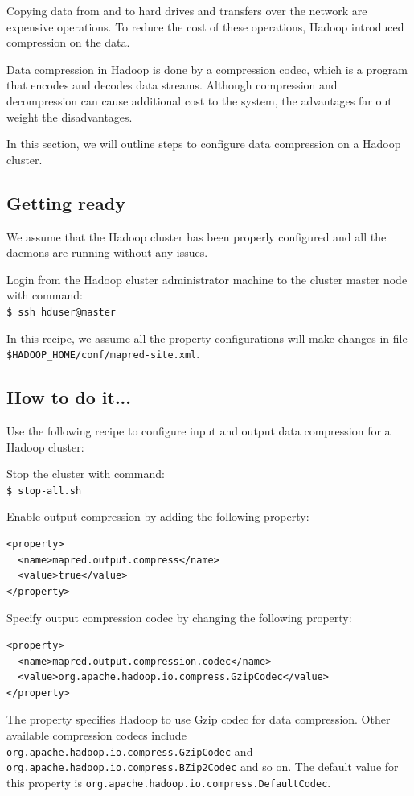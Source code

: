Copying data from and to hard drives and transfers over the network are expensive operations. To reduce the cost of these operations, Hadoop introduced compression on the data.

Data compression in Hadoop is done by a compression codec, which is a program that encodes and decodes data streams. Although compression and decompression can cause additional cost to the system, the advantages far out weight the disadvantages.

In this section, we will outline steps to configure data compression on a Hadoop cluster.

\subsection*{Getting ready}
We assume that the Hadoop cluster has been properly configured and all the daemons are running without any issues.

Login from the Hadoop cluster administrator machine to the cluster master node with command: \\
\verb|$ ssh hduser@master|

In this recipe, we assume all the property configurations will make changes in file \verb|$HADOOP_HOME/conf/mapred-site.xml|.
\subsection*{How to do it...}
Use the following recipe to configure input and output data compression for a Hadoop cluster:

Stop the cluster with command: \\
\verb|$ stop-all.sh|

Enable output compression by adding the following property:
\lstset{style=bashstyle}
\begin{lstlisting}
<property>
  <name>mapred.output.compress</name>
  <value>true</value>
</property>
\end{lstlisting}

Specify output compression codec by changing the following property:
\lstset{style=bashstyle}
\begin{lstlisting}
<property>
  <name>mapred.output.compression.codec</name>
  <value>org.apache.hadoop.io.compress.GzipCodec</value>
</property>
\end{lstlisting}

The property specifies Hadoop to use Gzip codec for data compression. Other available compression codecs include \verb|org.apache.hadoop.io.compress.GzipCodec| and \verb|org.apache.hadoop.io.compress.BZip2Codec| and so on. The default value for this property is \verb|org.apache.hadoop.io.compress.DefaultCodec|.

